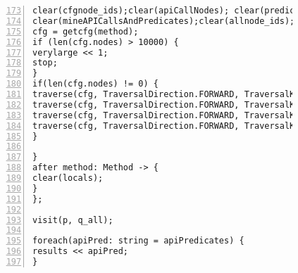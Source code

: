 \begin{figure}[ht!]
\begin{lstlisting}[numbers=left, tabsize=4, escapechar=@, caption={API Precondition Mining Analysis},label={lst:apm-code}, firstline = 173, firstnumber = 173, lastline = 234]
clear(cfgnode_ids);clear(apiCallNodes); clear(predicateExprsAtNodes);
clear(mineAPICallsAndPredicates);clear(allnode_ids);clear(cfg_dom); clear(dom_result);
cfg = getcfg(method);
if (len(cfg.nodes) > 10000) {
verylarge << 1;
stop;
}
if(len(cfg.nodes) != 0) {
traverse(cfg, TraversalDirection.FORWARD, TraversalKind.HYBRID, mineAPICallsAndPredicates);
traverse(cfg, TraversalDirection.FORWARD, TraversalKind.HYBRID, allnode_ids);
traverse(cfg, TraversalDirection.FORWARD, TraversalKind.HYBRID, cfg_dom, fixp1);
traverse(cfg, TraversalDirection.FORWARD, TraversalKind.HYBRID, dom_result);
}

}
after method: Method -> {
clear(locals);    
}
};

visit(p, q_all);

foreach(apiPred: string = apiPredicates) {
results << apiPred;                
}
\end{lstlisting}
\end{figure}